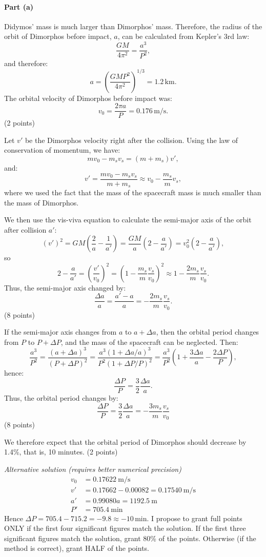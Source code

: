 \paragraph{Part (a)}

Didymos' mass is much larger than Dimorphos' mass. Therefore, the radius of
the orbit of Dimorphos before impact, $a$, can be calculated from Kepler's 3rd
law:
\[
  \frac{GM}{4\pi^2} = \frac{a^3}{P^2},
\]
and therefore:
\[
  a = \left(\frac{GMP^2}{4\pi^2}\right)^{1/3} = 1.2\,\mathrm{km}.
\]
The orbital velocity of Dimorphos before impact was:
\[
  v_0 = \frac{2\pi a}{P} = 0.176\,\mathrm{m/s}.
\]
\hfill(2 points)

Let $v'$ be the Dimorphos velocity right after the collision. Using the law of
conservation of momentum, we have:
\[
  mv_0 - m_s v_s = (m + m_s)v',
\]
and:
\[
  v' = \frac{mv_0 - m_s v_s}{m + m_s} \approx v_0 - \frac{m_s}{m}v_s,
\]
where we used the fact that the mass of the spacecraft mass is much smaller %
than the mass of Dimorphos.

We then use the vis-viva equation to calculate the semi-major axis of the
orbit after collision $a'$:
\[
  (v')^2 = GM\left(\frac{2}{a} - \frac{1}{a'}\right)
    = \frac{GM}{a}\left(2 - \frac{a}{a'}\right)
    = v_0^2\left(2 - \frac{a}{a'}\right),
\]
so
\[
  2 - \frac{a}{a'} = \left(\frac{v'}{v_0}\right)^2
    = \left(1 - \frac{m_s}{m}\frac{v_s}{v_0}\right)^2
    \approx 1 - \frac{2m_s}{m}\frac{v_s}{v_0}.
\]
Thus, the semi-major axis changed by:
\[
  \frac{\Delta a}{a} = \frac{a' - a}{a} = -\frac{2m_s}{m}\frac{v_s}{v_0}.
\]
\hfill(8 points)

If the semi-major axis changes from $a$ to $a + \Delta a$, then the orbital
period changes from $P$ to $P + \Delta P$, and the mass of the spacecraft can
be neglected. Then:
\[
  \frac{a^3}{P^2} = \frac{(a + \Delta a)^3}{(P + \Delta P)^2}
    = \frac{a^3(1 + \Delta a/a)^3}{P^2(1 + \Delta P/P)^2}
    = \frac{a^3}{P^2}
      \left(1 + \frac{3\Delta a}{a} - \frac{2\Delta P}{P}\right),
\]
hence:
\[
  \frac{\Delta P}{P} = \frac{3}{2}\frac{\Delta a}{a}.
\]
Thus, the orbital period changes by:
\[
  \frac{\Delta P}{P} = \frac{3}{2}\frac{\Delta a}{a}
    = -\frac{3m_s}{m}\frac{v_s}{v_0}
\]
\hfill(8 points)

We therefore expect that the orbital period of Dimorphos should decrease by
1.4\%, that is, 10 minutes. \hfill(2 points)

\medskip
\textit{Alternative solution (requires better numerical precision)}
\begin{align*}
  v_0 &= 0.17622\ \mathrm{m/s} \\
  v' &= 0.17662 - 0.00082 = 0.17540\ \mathrm{m/s} \\ %
  a' &= 0.99080a = 1192.5\ \mathrm{m} \\
  P' &= 705.4\ \mathrm{min}
\end{align*}
Hence $\Delta P = 705.4 - 715.2 = -9.8 \approx -10$\,min. I propose to grant
full points ONLY if the first four significant figures match the solution. If
the first three significant figures match the solution, grant 80\% of the
points. Otherwise (if the method is correct), grant HALF of the points.

